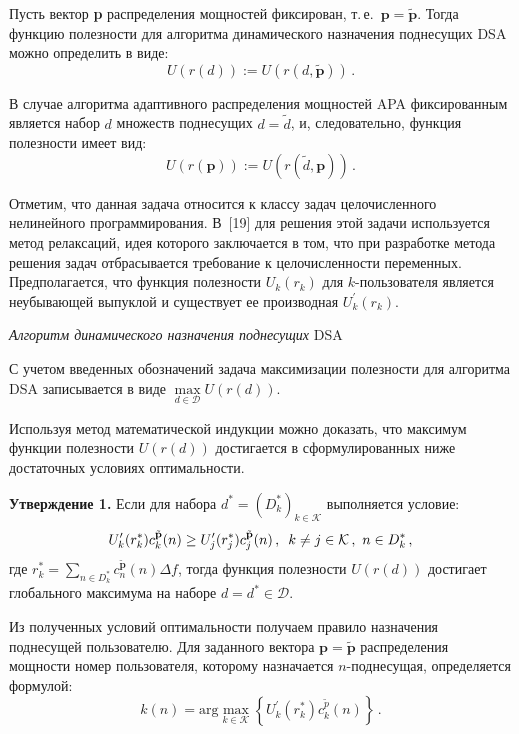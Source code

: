 \begin{multicols}{2}
     Пусть вектор \textbf{p} распределения мощностей фиксирован, т.\,е.\ 
$\mathbf{p}=\tilde{\mathbf{p}}$. Тогда функцию полезности для алгоритма 
динамического назначения поднесущих DSA можно определить в виде:
    $$
     U(r(d)){:=} U\left(r\left(d,\tilde{\mathbf{p}}\right)\right)\,.
     $$
     
     В случае алгоритма адаптивного распределения мощностей APA фиксированным 
является набор $d$ множеств поднесущих $d=\tilde{d}$, и, следовательно, функция 
полезности имеет вид:
     $$
     U(r(\mathbf{p})) {:=}  U\left( r\left( \tilde{d},\mathbf{p}\right)\right)\,.
     $$
  
  Отметим, что данная задача относится к классу задач целочисленного нелинейного 
программирования. В~[19] для решения этой задачи используется метод релаксаций, идея 
которого заключается в том, что при разработке метода решения задач отбрасывается 
требование к целочисленности переменных. Предполагается, что функция полезности 
$U_k(r_k)$ для $k$-пользователя является неубывающей выпуклой и существует ее 
производная $U^\prime_k(r_k)$.

\bigskip

\noindent
\textit{Алгоритм динамического назначения поднесущих} DSA
    
    
    \vspace*{2pt}
     
     С учетом введенных обозначений задача максимизации полезности для алгоритма 
DSA записывается в виде $\max\limits_{d\in \mathcal{D}} U(r(d))$.
     
     Используя метод математической индукции можно доказать, что максимум функции 
по\-лез\-ности $U(r(d))$ достигается в сформулированных ниже достаточных условиях 
оптимальности.


\medskip

\noindent
\textbf{Утверждение 1.} Если для набора $d^*=(D^*_k)_{k\in \mathcal{K}}$ выполняется 
условие:
$$
U^\prime_k (r^*_k) c_k^{\tilde{\mathbf{p}}}(n)\geq U^\prime_j (r^*_j) 
c_j^{\tilde{\mathbf{p}}}(n)\,,\enskip  k\not=j\in \mathcal{K}\,,\ n\in D_k^*\,,
$$
где $r_k^*=\sum\limits_{n\in D_k^*} c_n^{\tilde{\mathbf{p}}}(n)\Delta f$, тогда функция 
полезности $U(r(d))$ достигает глобального максимума на наборе $d=d^*\in 
\mathcal{D}$.
     
     \medskip
     
     Из полученных условий оптимальности получаем правило назначения поднесущей 
пользователю. Для заданного вектора $\mathbf{p}=\tilde{\mathbf{p}}$ распределения 
мощности номер пользователя, которому назначается $n$-поднесущая, определяется 
формулой:
     $$
     k(n) =\mathrm{arg}\max\limits_{k\in\mathcal{K}} \left\{ U^\prime_k (r_k^*) 
c_k^{\tilde{p}}(n)\right\}\,.
     $$


\end{multicols}
